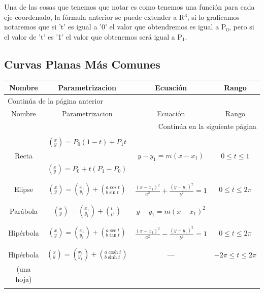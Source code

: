 \documentclass{article}
\begin{document}
Una de las cosas que tenemos que notar es como tenemos una función para cada eje coordenado, la fórmula anterior se puede extender a R\(^{\text{3}}\), si lo graficamos notaremos que si 't' es igual a '0' el valor que obtendremos es igual a P\(_{\text{0}}\), pero si el valor de 't' es '1' el valor que obtenemos será igual a P\(_{\text{1}}\).

\subsection{Curvas Planas Más Comunes}
\label{sec:org61ff22a}
\begin{longtable}{|c|c|c|c|}
\hline
Nombre & Parametrizacion & Ecuación & Rango\\
\hline
\endfirsthead
\multicolumn{4}{l}{Continúa de la página anterior} \\
\hline

Nombre & Parametrizacion & Ecuación & Rango \\

\hline
\endhead
\hline\multicolumn{4}{r}{Continúa en la siguiente página} \\
\endfoot
\endlastfoot
\hline
 &  &  & \\
 & \((^x_y)=P_0(1-t)+P_1t\) &  & \\
Recta &  & \(y-y_1=m(x-x_1)\) & \(0\leq t\leq 1\)\\
 & \((^x_y)=P_0+t(P_1-P_0)\) &  & \\
 &  &  & \\
\hline
 &  &  & \\
Elipse & \((^x_y)=(^{x_1}_{y_1})+\left(^{a\cos t}_{b\sin t}\right)\) & \(\frac{(x-x_1)^2}{a^2}+\frac{(y-y_1)^2}{b^2}=1\) & \(0\leq t\leq 2\pi\)\\
 &  &  & \\
\hline
 &  &  & \\
Parábola & \((^x_y)=(^{x_1}_{y_1})+\left(^{t}_{t^2}\right)\) & \(y-y_1=m(x-x_1)^2\) & ---\\
 &  &  & \\
\hline
 &  &  & \\
Hipérbola & \((^x_y)=(^{x_1}_{y_1})+\left(^{a\sec t}_{b\tan t}\right)\) & \(\frac{(x-x_1)^2}{a^2}-\frac{(y-y_1)^2}{b^2}=1\) & \(0\leq t\leq 2\pi\)\\
 &  &  & \\
\hline
 &  &  & \\
Hipérbola & \((^x_y)=(^{x_1}_{y_1})+\left(^{a\cosh t}_{b\sinh t}\right)\) & --- & \(-2\pi\leq t\leq 2\pi\)\\
(una hoja) &  &  & \\
 &  &  & \\
\hline
\end{longtable}
\end{document}
